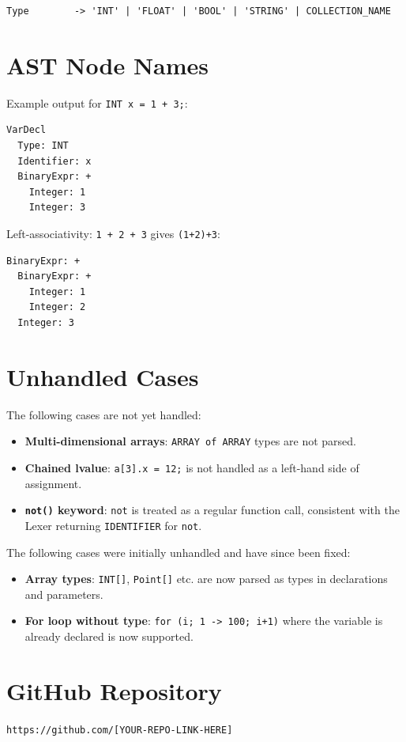 \documentclass[12pt,a4paper]{article}
\begin{document}
\begin{lstlisting}[style=grammar]
Type        -> 'INT' | 'FLOAT' | 'BOOL' | 'STRING' | COLLECTION_NAME
\end{lstlisting}

\section{AST Node Names}

Example output for \texttt{INT x = 1 + 3;}:

\begin{lstlisting}[style=grammar]
VarDecl
  Type: INT
  Identifier: x
  BinaryExpr: +
    Integer: 1
    Integer: 3
\end{lstlisting}

Left-associativity: \texttt{1 + 2 + 3} gives \texttt{(1+2)+3}:

\begin{lstlisting}[style=grammar]
BinaryExpr: +
  BinaryExpr: +
    Integer: 1
    Integer: 2
  Integer: 3
\end{lstlisting}

\section{Unhandled Cases}

The following cases are not yet handled:

\begin{itemize}
    \item \textbf{Multi-dimensional arrays}: \texttt{ARRAY of ARRAY} types are not parsed.
    \item \textbf{Chained lvalue}: \texttt{a[3].x = 12;} is not handled as a left-hand side of assignment.
    \item \textbf{\texttt{not()} keyword}: \texttt{not} is treated as a regular function call, consistent with the Lexer returning \texttt{IDENTIFIER} for \texttt{not}.
\end{itemize}

The following cases were initially unhandled and have since been fixed:
\begin{itemize}
    \item \textbf{Array types}: \texttt{INT[]}, \texttt{Point[]} etc. are now parsed as types in declarations and parameters.
    \item \textbf{For loop without type}: \texttt{for (i; 1 -> 100; i+1)} where the variable is already declared is now supported.
\end{itemize}

\section{GitHub Repository}

\begin{center}
    \texttt{https://github.com/[YOUR-REPO-LINK-HERE]}
\end{center}
\end{document}
